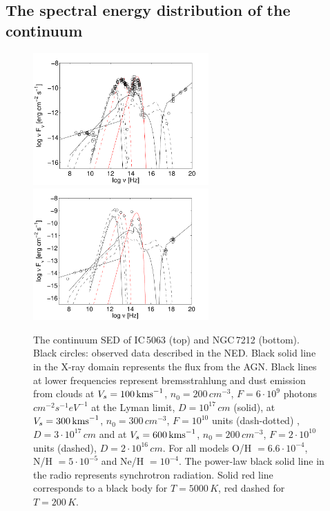 \documentclass[../main.tex]{subfiles}
\begin{document}
\subsection{The spectral energy distribution of the continuum}

\begin{figure}
\centering
\includegraphics[width=0.6\textwidth]{images/paper1/sedic50.pdf}\\
\includegraphics[width=0.6\textwidth]{images/paper1/sedn72.pdf}
\caption{The continuum SED of IC\,5063 (top) and NGC\,7212 (bottom).
Black circles: observed data described in the NED.
Black solid line in the X-ray domain represents the flux from the AGN.
Black lines at lower frequencies represent bremsstrahlung and dust emission from clouds at $V_s=100\,\si{\kms}$, $n_0=200\,\si{cm^{-3}}$, $F=6 \cdot 10^9$ photons $\si{cm^{-2} s^{-1} eV^{-1}}$ at the Lyman limit, $ D=10^{17}\,\si{cm}$ (solid), at $V_s=300\,\si{\kms}$, $n_0=300 \,\si{cm^{-3}}$, $F= 10^{10}$ units (dash-dotted) , $ D=3\cdot10^{17}\,\si{ cm}$ and at $V_s= 600\,\si{\kms}$,  $n_0=200\,\si{cm^{-3}}$, $F=2\cdot10^{10}$  units (dashed), $ D=2\cdot10^{16}\,\si{ cm}$. 
For all models O/H $=6.6\cdot10^{-4}$, N/H $= 5\cdot10^{-5}$ and Ne/H $= 10^{-4}$.
The power-law black solid line in the radio represents synchrotron radiation.
Solid red line corresponds to a black body for $T=5000\,\si{K}$, red dashed for $T=200\,\si{K}$.}
\label{fig:SED}
\end{figure}
\end{document}

